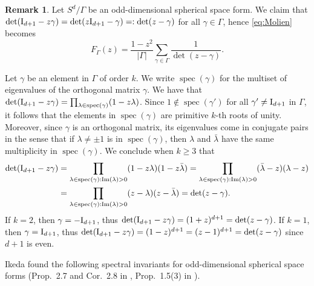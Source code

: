 \documentclass[12pt,a4paper,final]{amsart}
\theoremstyle{plain}
\theoremstyle{definition}
\newtheorem{remark}[theorem]{Remark}
\theoremstyle{remark}
\numberwithin{equation}{section}
\newcommand{\op}{\operatorname}
\newcommand{\Id}{\textup{I}}
\DeclareMathOperator{\spec}{spec}
\begin{document}
\begin{remark}
Let $S^d/\Gamma$ be an odd-dimensional spherical space form.
We claim that $\det(\Id_{d+1}-z\gamma)=\det(z\Id_{d+1}-\gamma)=:\det(z-\gamma)$ for all $\gamma\in\Gamma$, hence \eqref{eq:Molien} becomes
\begin{equation}\label{eq:Molien2}
F_{\Gamma}(z)=\frac{1-z^2}{|\Gamma|} \sum_{\gamma\in\Gamma} \frac{1}{\det(z-\gamma)}.
\end{equation}

Let $\gamma$ be an element in $\Gamma$ of order $k$. 
We write $\spec(\gamma)$ for the multiset of eigenvalues of the orthogonal matrix $\gamma$. 
We have that $\det(\Id_{d+1}-z\gamma)=\prod_{\lambda\in\spec(\gamma)}(1-z\lambda)$. 
Since $1\notin \spec(\gamma')$ for all $\gamma'\neq\Id_{d+1}$ in $\Gamma$, 
it follows that the elements in $\spec(\gamma)$ are primitive $k$-th roots of unity. 
Moreover, since $\gamma$ is an orthogonal matrix, its eigenvalues come in conjugate pairs in the sense that if $\lambda\neq\pm1$ is in $\spec(\gamma)$, then $\lambda$ and $\bar \lambda$ have the same multiplicity in $\spec(\gamma)$. 
We conclude when $k\geq3$ that 
\begin{equation}
\begin{aligned}
\det(\Id_{d+1}-z\gamma)&
=\prod_{\lambda\in\spec(\gamma): \op{Im}(\lambda)>0}(1-z\lambda)(1-z\bar\lambda)
=\prod_{\lambda\in\spec(\gamma): \op{Im}(\lambda)>0}(\bar \lambda-z)(\lambda-z)
\\ &
=\prod_{\lambda\in\spec(\gamma): \op{Im}(\lambda)>0}(z-\lambda)(z-\bar\lambda)
=\det(z-\gamma)
.
\end{aligned}
\end{equation}
If $k=2$, then $\gamma=-\Id_{d+1}$, thus $\det(\Id_{d+1}-z\gamma)=(1+z)^{d+1} =\det(z-\gamma)$.
If $k=1$, then $\gamma=\Id_{d+1}$, thus $\det(\Id_{d+1}-z\gamma)=(1-z)^{d+1}=(z-1)^{d+1}= \det(z-\gamma)$ since $d+1$ is even. 

\end{remark}

Ikeda found the following spectral invariants for odd-dimensional spherical space forms (Prop.~2.7 and Cor.~2.8 in \cite{Ikeda80_3-dimI}, Prop.~1.5(3) in \cite{Ikeda80_3-dimII}). 
\end{document}
